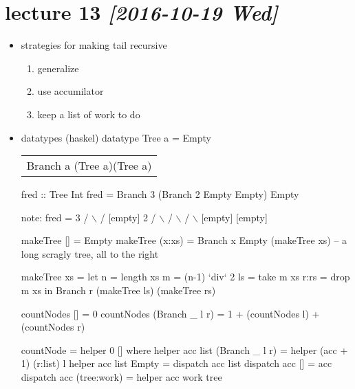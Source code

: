 \documentclass[11pt]{article}
\begin{document}
\section{lecture 13 \textit{[2016-10-19 Wed]}}
\label{sec-12}
\begin{itemize}
\item strategies for making tail recursive
\begin{enumerate}
\item generalize
\item use accumilator
\item keep a list of work to do
\end{enumerate}
\item datatypes (haskel)
datatype Tree a = Empty
\begin{center}
\begin{tabular}{l}
Branch a (Tree a)(Tree a)\\
\end{tabular}
\end{center}
fred :: Tree Int
fred = Branch 3 (Branch 2 Empty Empty) Empty

 note: 
 fred =  3
        / $\backslash$
       / [empty]
      2
     / $\backslash$
    /   $\backslash$
   /     $\backslash$
[empty] [empty]

makeTree [] = Empty
makeTree (x:xs) = Branch x Empty (makeTree xs) -- a long scragly tree, all to the right

makeTree xs = let
         n = length xs
         m = (n-1) `div` 2
         ls = take m xs
         r:rs = drop m xs
         in Branch r (makeTree ls) (makeTree rs)

countNodes [] = 0
countNodes (Branch \_ l r) = 1 + (countNodes l) + (countNodes r)

countNode = helper 0 [] where
  helper acc list (Branch \_ l r) =
    helper (acc + 1) (r:list) l
  helper acc list Empty = dispatch acc list
    dispatch acc [] = acc
    dispatch acc (tree:work) = helper acc work tree
\end{itemize}
\end{document}
